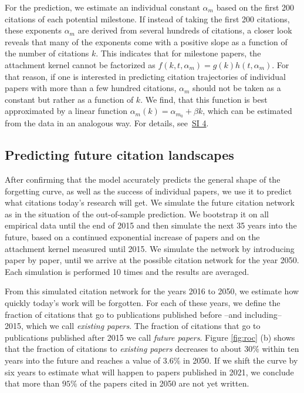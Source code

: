 \documentclass[draft,final]{vutinfth} %
\begin{document}
For the prediction, we estimate an individual constant $\alpha_m$ based on the first 200 citations of each potential milestone. If instead of taking the first 200 citations, these exponents $\alpha_m$ are derived from several hundreds of citations, a closer look reveals that many of the exponents come with a positive slope as a function of the number of citations $k$. This indicates that for milestone papers, the attachment kernel cannot be factorized as $f(k,t, \alpha_m)=g(k) h(t, \alpha_m)$. For that reason, if one is interested in predicting citation trajectories of individual papers with more than a few hundred citations, $\alpha_m$ should not be taken as a constant but rather as a function of $k$. We find, that this function is best approximated by a linear function $\alpha_m(k) = \alpha_{m_{0}} + \beta k$, which can be estimated from the data in an analogous way. For details, see~\hyperref[SIM4]{SI 4}.

\subsection{Predicting future citation landscapes}
After confirming that the model accurately predicts the general shape of the forgetting curve, as well as the success of individual papers, we use it to predict what citations today's research will get. We simulate the future citation network as in the situation of the out-of-sample prediction. We bootstrap it on all empirical data until the end of 2015 and then simulate the next 35 years into the future, based on a continued exponential increase of papers and on the attachment kernel measured until 2015. We simulate the network by introducing paper by paper, until we arrive at the possible citation network for the year 2050. Each simulation is performed 10 times and the results are averaged.

From this simulated citation network for the years 2016 to 2050, we estimate how quickly today's work will be forgotten. For each of these years, we define the fraction of citations that go to publications published before --and including-- 2015, which we call \textit{existing papers}. The fraction of citations that go to publications published after 2015 we call \textit{future papers}. Figure \ref{fig:roc} (b) shows that the fraction of citations to \textit{existing papers} decreases to about $30\%$ within ten years into the future and reaches a value of $3.6\%$ in 2050. If we shift the curve by six years to estimate what will happen to papers published in 2021, we conclude that more than $95\%$ of the papers cited in 2050 are not yet written. 
\end{document}
